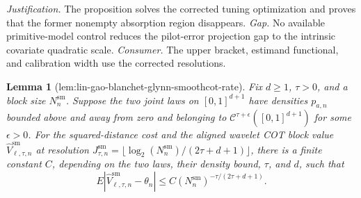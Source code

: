 \documentclass{article}
\newtheorem{lemma}{Lemma}
\begin{document}
\par\smallskip\noindent \textit{Justification.} The proposition solves the corrected tuning optimization and proves that the former nonempty absorption region disappears. \textit{Gap.} No available primitive-model control reduces the pilot-error projection gap to the intrinsic covariate quadratic scale. \textit{Consumer.} The upper bracket, estimand functional, and calibration width use the corrected resolutions.

\begin{lemma}[lem:lin-gao-blanchet-glynn-smoothcot-rate]\label{lem:lin-gao-blanchet-glynn-smoothcot-rate}
Fix \(d\ge1\), \(\tau>0\), and a block size \(N_n^{\mathrm{sm}}\). Suppose the two joint laws on \([0,1]^{d+1}\) have densities \(p_{a,n}\) bounded above and away from zero and belonging to \(\mathcal C^{\tau+\epsilon}([0,1]^{d+1})\) for some \(\epsilon>0\). For the squared-distance cost and the aligned wavelet COT block value \(\widehat V_{\ell,\tau,n}^{\mathrm{sm}}\) at resolution \(J_{\tau,n}^{\mathrm{sm}}=\lfloor\log_2(N_n^{\mathrm{sm}})/(2\tau+d+1)\rfloor\), there is a finite constant \(C\), depending on the two laws, their density bound, \(\tau\), and \(d\), such that
\[
E\left|\widehat V_{\ell,\tau,n}^{\mathrm{sm}}-\theta_n\right|
\le C(N_n^{\mathrm{sm}})^{-\tau/(2\tau+d+1)}.
\]
\end{lemma}
\end{document}
